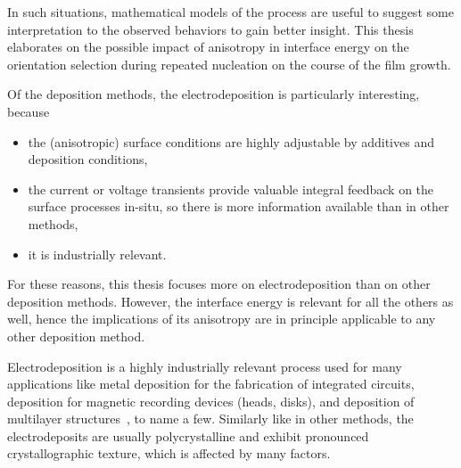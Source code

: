 In such situations, mathematical models of the process are useful to suggest some interpretation to the observed behaviors to gain better insight. This thesis elaborates on the possible impact of anisotropy in interface energy on the orientation selection during repeated nucleation on the course of the film growth. 

Of the deposition methods, the electrodeposition is particularly interesting, because
\begin{itemize}
	\item the (anisotropic) surface conditions are highly adjustable by additives and deposition conditions,
	\item the current or voltage transients provide valuable integral feedback on the surface processes in-situ, so there is more information available than in other methods,
	\item it is industrially relevant.
\end{itemize}
For these reasons, this thesis focuses more on electrodeposition than on other deposition methods. However, the interface energy is relevant for all the others as well, hence the implications of its anisotropy are in principle applicable to any other deposition method. 

Electrodeposition is a highly industrially relevant process used for many applications like metal deposition for the fabrication of integrated circuits, deposition for magnetic recording devices (heads, disks), and deposition
of multilayer structures~\cite{Schlesinger2006}, to name a few. Similarly like in other methods, the electrodeposits are usually polycrystalline and exhibit pronounced crystallographic texture, which is affected by many factors. 



